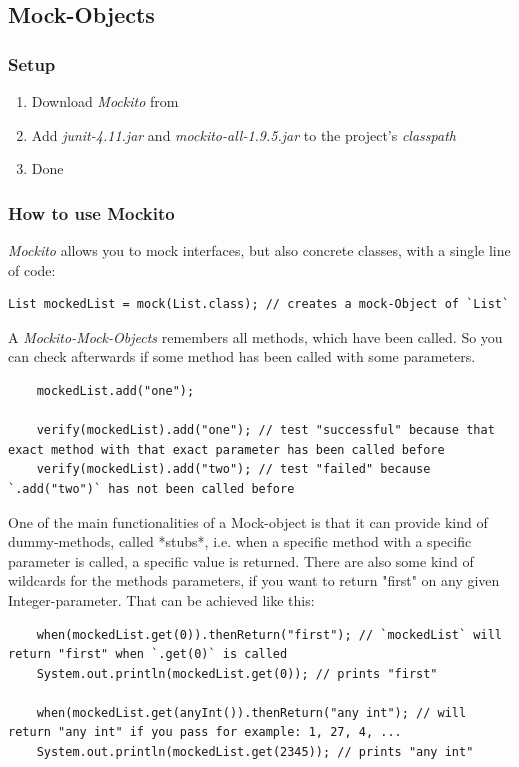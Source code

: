 \documentclass[11pt, a4paper]{article}
\begin{document}
\subsection{Mock-Objects}
\subsubsection{Setup}

\begin{enumerate}
	\item Download \textit{Mockito} from \cite{MockitoDownload}
	\item Add \textit{junit-4.11.jar} and \textit{mockito-all-1.9.5.jar} to the project's \textit{classpath}
	\item Done
\end{enumerate}

\subsubsection{How to use Mockito}

\textit{Mockito} allows you to mock interfaces, but also concrete classes, with a single line of code:
	
\begin{lstlisting} 
List mockedList = mock(List.class); // creates a mock-Object of `List` 
\end{lstlisting}
	
A \textit{Mockito-Mock-Objects} remembers all methods, which have been called. So you can check afterwards if some method has been called with some parameters.
	
\begin{lstlisting}
	mockedList.add("one");
	    
	verify(mockedList).add("one"); // test "successful" because that exact method with that exact parameter has been called before
	verify(mockedList).add("two"); // test "failed" because `.add("two")` has not been called before
\end{lstlisting}

One of the main functionalities of a Mock-object is that it can provide kind of dummy-methods, called *stubs*, i.e. when a specific method with a specific parameter is called, a specific
value is returned. There are also some kind of wildcards for the methods parameters, if you want to return "first" on any given Integer-parameter. That can be achieved like this:

\begin{lstlisting}
    when(mockedList.get(0)).thenReturn("first"); // `mockedList` will return "first" when `.get(0)` is called
    System.out.println(mockedList.get(0)); // prints "first"
    
    when(mockedList.get(anyInt()).thenReturn("any int"); // will return "any int" if you pass for example: 1, 27, 4, ...
    System.out.println(mockedList.get(2345)); // prints "any int"
\end{lstlisting}
\end{document}
